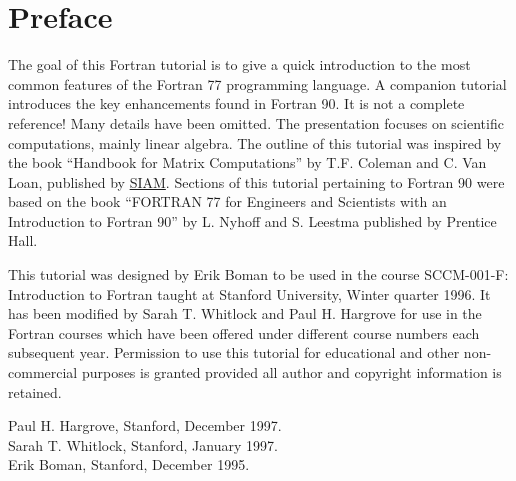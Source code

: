 \section{Preface}

The goal of this Fortran tutorial is to give a quick introduction to the
most common features of the Fortran 77 programming language. A companion
tutorial introduces the key enhancements found in Fortran 90. It is not
a complete reference! Many details have been omitted. The presentation
focuses on scientific computations, mainly linear algebra. The outline
of this tutorial was inspired by the book ``Handbook for Matrix
Computations'' by T.F. Coleman and C. Van Loan, published by
\href{http://www.siam.org/}{SIAM}. Sections of this tutorial pertaining
to Fortran 90 were based on the book ``FORTRAN 77 for Engineers and
Scientists with an Introduction to Fortran 90'' by L. Nyhoff and S.
Leestma published by Prentice Hall.

This tutorial was designed by Erik Boman to be used in the course
SCCM-001-F: Introduction to Fortran taught at Stanford University,
Winter quarter 1996. It has been modified by Sarah T. Whitlock and Paul
H. Hargrove for use in the Fortran courses which have been offered under
different course numbers each subsequent year. Permission to use this
tutorial for educational and other non-commercial purposes is granted
provided all author and copyright information is retained.

Paul H. Hargrove, Stanford, December 1997. \\
Sarah T. Whitlock, Stanford, January 1997. \\
Erik Boman, Stanford, December 1995.

\footer
